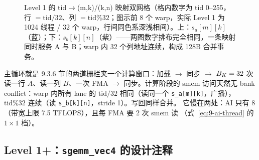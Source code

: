 \begin{figure}[H]
\caption{Level 1 的 tid$\to$(m,k)/(k,n) 映射双网格（格内数字为 tid 0--255，行 $=\mathrm{tid}/32$、列 $=\mathrm{tid}\%32$；图示前 8 个 warp，实际 Level 1 为 1024 线程 / 32 个 warp，行间同色系深浅相间）。上：$s_a[m][k]$（蓝）；下：$s_b[k][n]$（紫）——两图数字排布完全相同，一条映射同时服务 A 与 B；warp 内 32 个列地址连续，构成 128B 合并事务。}
\label{fig:09-tid-map}
\end{figure}



主循环就是 9.3.6 节的两道栅栏夹一个计算窗口：加载 $\to$ 同步 $\to$
$B\sb{K}=32$ 次读一行 $A$、读一列 $B$、一次 FMA $\to$ 同步。计算阶段的
smem 访问天然无 bank conflict：warp 内所有 lane 的
$\mathrm{tid}/32$ 相同（读同一个 \texttt{s\_a[m][k]}，广播），
$\mathrm{tid}\%32$ 连续（读 \texttt{s\_b[k][n]}，stride 1）。写回同样合并。
它慢在两处：AI 只有 8（带宽上限 7.5 TFLOPS），且每 FMA 要 2 次 smem 读
（式~\ref{eq:9-ai-thread} 的 $1 \times 1$ 档）。

\subsection{Level 1+：\texttt{sgemm\_vec4} 的设计注释}

